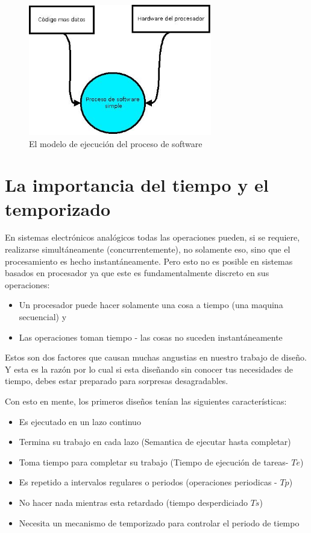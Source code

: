\documentclass[12pt, twoside]{report}
\begin{document}
\begin{figure}
\centering
\includegraphics[width=80mm]{runtimemodel}
\caption{El modelo de ejecución del proceso de software}
\label{cap1:002}
\end{figure}

\section{La importancia del tiempo y el temporizado}
En sistemas electrónicos analógicos todas las operaciones pueden, si se requiere, realizarse simultáneamente (concurrentemente), no solamente eso, sino que el procesamiento es hecho instantáneamente. Pero esto no es posible en sistemas basados en procesador ya que este es fundamentalmente discreto en sus operaciones:

\begin{itemize}
	\item Un procesador puede hacer solamente una cosa a tiempo (una maquina secuencial) y
	\item Las operaciones toman tiempo - las cosas no suceden instantáneamente
\end{itemize}

Estos son dos factores que causan muchas angustias en nuestro trabajo de diseño. Y esta es la razón por lo cual si esta diseñando sin conocer tus necesidades de tiempo, debes estar preparado para sorpresas desagradables.

Con esto en mente, los primeros diseños tenían las siguientes características:
\begin{itemize}
	\item Es ejecutado en un lazo continuo
	\item Termina su trabajo en cada lazo (Semantica de ejecutar hasta completar)
	\item Toma tiempo para completar su trabajo (Tiempo de ejecución de tareas- $Te$)
	\item Es repetido a intervalos regulares o periodos (operaciones periodicas - $Tp$)
	\item No hacer nada mientras esta retardado (tiempo desperdiciado $Ts$)
	\item Necesita un mecanismo de temporizado para controlar el periodo de tiempo 
\end{itemize}
\end{document}
